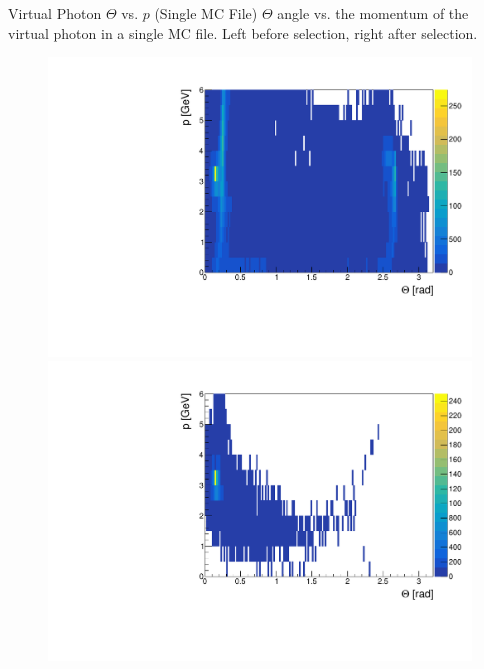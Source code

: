 \documentclass[10pt]{beamer}
\begin{document}
\begin{frame}{Virtual Photon $\Theta$ vs. $p$ (Single MC File)}
	$\Theta$ angle vs. the momentum of the virtual photon in a single MC file. Left before selection, right after selection.
	
	\begin{figure}
		\centering
		\begin{minipage}{.5\textwidth}
			\centering
			\includegraphics[width=\textwidth]{gg/ThetaMgg_BS}
			
		\end{minipage}%
		\begin{minipage}{.5\textwidth}
			\centering
			\includegraphics[width=\textwidth]{gg/ThetaMgg_AS}
			
		\end{minipage}
	\end{figure}
\end{frame}
\end{document}

